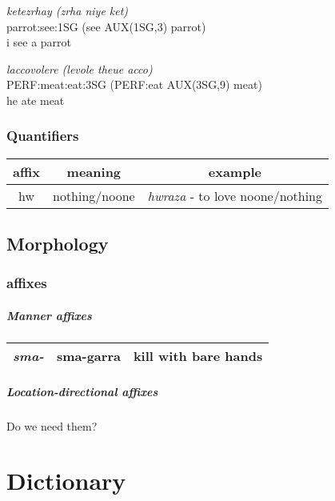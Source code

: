 \documentclass[8pt]{book}
\begin{document}
\begin{exe}
\ex 
\gll \textit{ketezrhay (zrha niye ket)} \\
  parrot:see:1SG (see AUX(1SG,3) parrot) \\
\trans i see a parrot

\ex 
\gll \textit{laccovolere (levole theue acco)} \\
  PERF:meat:eat:3SG (PERF:eat AUX(3SG,9) meat) \\
\trans he ate meat
\end{exe}

\subsection{Quantifiers}

\begin{center}
\begin{tabular}{c | c | c}
affix & meaning & example \\ \hline
hw & nothing/noone & \textit{hwraza} - to love noone/nothing \\
\end{tabular}
\end{center}


\section{Morphology}
\subsection{affixes}
\paragraph{Manner affixes}
\begin{center}
\begin{tabular}{| c | c | c |}
  \hline
  \textit{sma-} & sma-garra & kill with bare hands \\ \hline
\end{tabular}
\end{center}

\paragraph{Location-directional affixes} Do we need them?

\chapter{Dictionary}
\end{document}
